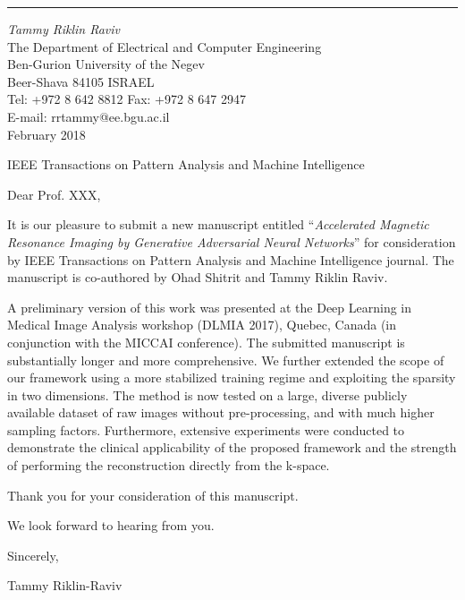 \documentclass[12pt]{article}
\begin{document}
\thispagestyle{empty}


\sloppy

\vskip0.3cm
\hrule width11.5cm height1pt %
\vskip0.1cm
{\it Tammy Riklin Raviv}\\[0.05cm]
{\small The Department of Electrical and Computer Engineering} \\[0.07cm]
{\small Ben-Gurion University of the Negev} \\
{\small Beer-Shava 84105 {\hskip6pt} ISRAEL}\\[0.1cm]
{\scriptsize Tel: +972 8 642 8812}\hspace{8pt}
               {\scriptsize Fax: +972 8 647 2947}\\
{\scriptsize E-mail: \hspace{1pt} rrtammy@ee.bgu.ac.il}\\

\vspace{-0.7cm}
\hfill February 2018


IEEE Transactions on Pattern Analysis and Machine Intelligence
\vspace{0.2cm}

Dear Prof. XXX, 


\vspace{0.2cm}

It is our pleasure to submit a new manuscript entitled  ``{\it Accelerated Magnetic Resonance Imaging by Generative Adversarial Neural Networks}'' for
consideration by IEEE Transactions on Pattern Analysis and Machine Intelligence journal. 
The manuscript is co-authored by Ohad Shitrit and Tammy Riklin Raviv.

A preliminary version of this work was presented at the Deep Learning in Medical Image Analysis workshop (DLMIA 2017), Quebec, Canada
(in conjunction with the MICCAI conference). The submitted manuscript is substantially
longer and more comprehensive. We further extended the scope of our framework using a more stabilized training regime and exploiting the sparsity in two dimensions. The method is now tested on a large, diverse publicly available dataset of raw images without pre-processing, and with much higher sampling factors. Furthermore, extensive experiments were conducted to demonstrate the clinical applicability of the proposed framework and the strength of performing the reconstruction directly from the k-space.

Thank you for your consideration of this manuscript. 

We look forward to hearing from you.

\vspace{1cm}


Sincerely,

\vspace{0.2cm}

Tammy Riklin-Raviv
\end{document}
